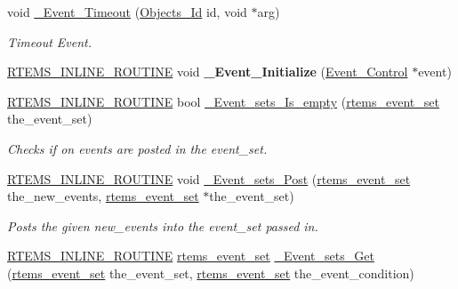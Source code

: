 \begin{DoxyCompactItemize}
void \mbox{\hyperlink{group__ClassicEventImpl_ga2d92f9c0f88e1f333eadaa0ab470c1d3}{\+\_\+\+Event\+\_\+\+Timeout}} (\mbox{\hyperlink{group__RTEMSScoreObject_ga5821f52a51072941bdd603e542d0863e}{Objects\+\_\+\+Id}} id, void $\ast$arg)
\begin{DoxyCompactList}\small\item\em Timeout Event. \end{DoxyCompactList}\item 
\mbox{\label{group__ClassicEventImpl_ga49942beeaf2bfd993858c5dcd4e8c697}} 
\mbox{\hyperlink{group__RTEMSScoreBaseDefs_gac216239df231d5dbd15e3520b0b9313f}{R\+T\+E\+M\+S\+\_\+\+I\+N\+L\+I\+N\+E\+\_\+\+R\+O\+U\+T\+I\+NE}} void {\bfseries \+\_\+\+Event\+\_\+\+Initialize} (\mbox{\hyperlink{structEvent__Control}{Event\+\_\+\+Control}} $\ast$event)
\item 
\mbox{\hyperlink{group__RTEMSScoreBaseDefs_gac216239df231d5dbd15e3520b0b9313f}{R\+T\+E\+M\+S\+\_\+\+I\+N\+L\+I\+N\+E\+\_\+\+R\+O\+U\+T\+I\+NE}} bool \mbox{\hyperlink{group__ClassicEventImpl_gad7150e351d71bedd3ac0033aca933e4b}{\+\_\+\+Event\+\_\+sets\+\_\+\+Is\+\_\+empty}} (\mbox{\hyperlink{group__ClassicEventSet_gab7b8f373bea85fd4e3b7ae23905faa07}{rtems\+\_\+event\+\_\+set}} the\+\_\+event\+\_\+set)
\begin{DoxyCompactList}\small\item\em Checks if on events are posted in the event\+\_\+set. \end{DoxyCompactList}\item 
\mbox{\hyperlink{group__RTEMSScoreBaseDefs_gac216239df231d5dbd15e3520b0b9313f}{R\+T\+E\+M\+S\+\_\+\+I\+N\+L\+I\+N\+E\+\_\+\+R\+O\+U\+T\+I\+NE}} void \mbox{\hyperlink{group__ClassicEventImpl_ga7f13b2e266b6f66390fcdf588ae80262}{\+\_\+\+Event\+\_\+sets\+\_\+\+Post}} (\mbox{\hyperlink{group__ClassicEventSet_gab7b8f373bea85fd4e3b7ae23905faa07}{rtems\+\_\+event\+\_\+set}} the\+\_\+new\+\_\+events, \mbox{\hyperlink{group__ClassicEventSet_gab7b8f373bea85fd4e3b7ae23905faa07}{rtems\+\_\+event\+\_\+set}} $\ast$the\+\_\+event\+\_\+set)
\begin{DoxyCompactList}\small\item\em Posts the given new\+\_\+events into the event\+\_\+set passed in. \end{DoxyCompactList}\item 
\mbox{\hyperlink{group__RTEMSScoreBaseDefs_gac216239df231d5dbd15e3520b0b9313f}{R\+T\+E\+M\+S\+\_\+\+I\+N\+L\+I\+N\+E\+\_\+\+R\+O\+U\+T\+I\+NE}} \mbox{\hyperlink{group__ClassicEventSet_gab7b8f373bea85fd4e3b7ae23905faa07}{rtems\+\_\+event\+\_\+set}} \mbox{\hyperlink{group__ClassicEventImpl_ga54b2878b4c9c279267030c1b4bca9083}{\+\_\+\+Event\+\_\+sets\+\_\+\+Get}} (\mbox{\hyperlink{group__ClassicEventSet_gab7b8f373bea85fd4e3b7ae23905faa07}{rtems\+\_\+event\+\_\+set}} the\+\_\+event\+\_\+set, \mbox{\hyperlink{group__ClassicEventSet_gab7b8f373bea85fd4e3b7ae23905faa07}{rtems\+\_\+event\+\_\+set}} the\+\_\+event\+\_\+condition)

\end{DoxyCompactItemize}

